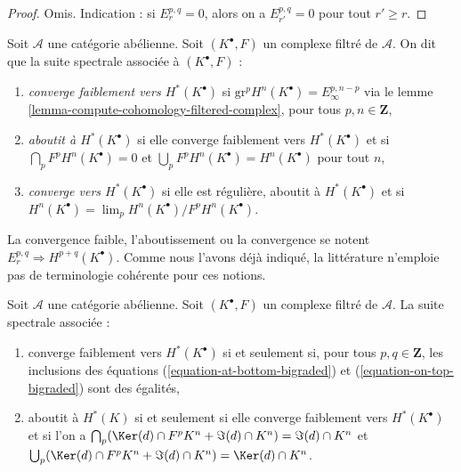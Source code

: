 \begin{proof}
Omis. Indication : si $E_r^{p, q} = 0$, alors on a $E_{r'}^{p, q} = 0$
pour tout $r' \geq r$.
\end{proof}

\begin{definition}
\label{definition-filtered-complex-ss-converges}
Soit $\mathcal{A}$ une catégorie abélienne. Soit $(K^\bullet, F)$ un
complexe filtré de $\mathcal{A}$. On dit que la suite spectrale
associée à $(K^\bullet, F)$ :
\begin{enumerate}
\item {\it converge faiblement vers $H^*(K^\bullet)$} si
$\text{gr}^pH^n(K^\bullet) = E_{\infty}^{p, n - p}$
via le lemme \ref{lemma-compute-cohomology-filtered-complex},
pour tous $p, n \in \mathbf{Z}$,
\item {\it aboutit à $H^*(K^\bullet)$} si elle converge faiblement vers
$H^*(K^\bullet)$ et si $\bigcap_p F^pH^n(K^\bullet) = 0$ et
$\bigcup_p F^p H^n(K^\bullet) = H^n(K^\bullet)$ pour tout $n$,
\item {\it converge vers $H^*(K^\bullet)$} si elle est régulière,
aboutit à $H^*(K^\bullet)$ et si
$H^n(K^\bullet) = \lim_p H^n(K^\bullet)/F^pH^n(K^\bullet)$.
\end{enumerate}
\end{definition}

\noindent
La convergence faible, l'aboutissement ou la convergence se notent
$E_r^{p, q} \Rightarrow H^{p + q}(K^\bullet)$.
Comme nous l'avons déjà indiqué, la littérature n'emploie pas de terminologie
cohérente pour ces notions.

\begin{lemma}
\label{lemma-filtered-complex-ss-converges}
Soit $\mathcal{A}$ une catégorie abélienne. Soit $(K^\bullet, F)$ un complexe
filtré de $\mathcal{A}$. La suite spectrale associée :
\begin{enumerate}
\item converge faiblement vers $H^*(K^\bullet)$ si et seulement si, pour tous
$p, q \in \mathbf{Z}$, les inclusions des équations
(\ref{equation-at-bottom-bigraded}) et (\ref{equation-on-top-bigraded}) sont des égalités,
\item aboutit à $H^*(K)$ si et seulement si elle converge faiblement vers $H^*(K^\bullet)$
et si l'on a
$\bigcap_p (\Ker(d) \cap F^pK^n + \Im(d) \cap K^n) = \Im(d) \cap K^n$
et
$\bigcup_p (\Ker(d) \cap F^pK^n + \Im(d) \cap K^n) = \Ker(d) \cap K^n$.
\end{enumerate}
\end{lemma}

